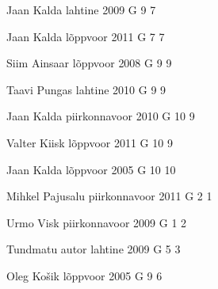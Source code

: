 \documentclass[11pt]{article}
\begin{document}
{Jaan Kalda} %
{lahtine} %
{2009} %
{G 9} %
{7} %
{

\ifEngHint
\fi
}

{Jaan Kalda} %
{lõppvoor} %
{2011} %
{G 7} %
{7} %
{

\ifEngHint
\fi
}

{Siim Ainsaar} %
{lõppvoor} %
{2008} %
{G 9} %
{9} %
{

\ifEngHint
\fi
}

{Taavi Pungas} %
{lahtine} %
{2010} %
{G 9} %
{9} %
{

\ifEngHint
\fi
}

{Jaan Kalda} %
{piirkonnavoor} %
{2010} %
{G 10} %
{9} %
{

\ifEngHint
\fi
}

{Valter Kiisk} %
{lõppvoor} %
{2011} %
{G 10} %
{9} %
{

\ifEngHint
\fi
}

{Jaan Kalda} %
{lõppvoor} %
{2005} %
{G 10} %
{10} %
{

\ifEngHint
\fi
}

{Mihkel Pajusalu} %
{piirkonnavoor} %
{2011} %
{G 2} %
{1} %
{

\ifEngHint
\fi
}

{Urmo Visk} %
{piirkonnavoor} %
{2009} %
{G 1} %
{2} %
{

\ifEngHint
\fi
}

{Tundmatu autor} %
{lahtine} %
{2009} %
{G 5} %
{3} %
{

\ifEngHint
\fi
}

{Oleg Košik} %
{lõppvoor} %
{2005} %
{G 9} %
{6} %
{

\ifEngHint
\fi
}
\end{document}
